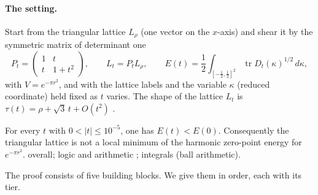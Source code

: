 \paragraph{The setting.} Start from the triangular lattice $L_\rho$ (one vector on the $x$-axis) and shear it by the
symmetric matrix of determinant one
\[
P_t=\begin{pmatrix}1&t\\t&1+t^2\end{pmatrix},\qquad L_t=P_tL_\rho,\qquad
E(t)=\frac12\int_{[-\frac12,\frac12]^2}\operatorname{tr}D_t(\kappa)^{1/2}\,d\kappa ,
\]
with $V=e^{-\pi r^2}$, and with the lattice labels and the variable $\kappa$ (reduced coordinate) held fixed as $t$
varies. The shape of the lattice $L_t$ is $\tau(t)=\rho+\sqrt3\,t+O(t^2)$ \tierC.

\begin{theorem}[B2]\label{ch3:thm:b2}
For every $t$ with $0<|t|\le10^{-5}$, one has $E(t)<E(0)$. Consequently the triangular lattice is not a local minimum
of the harmonic zero-point energy for $e^{-\pi r^2}$. \tierC{} overall; logic and arithmetic \tierAs{}; integrals
\tierC{} (ball arithmetic).
\end{theorem}
\noindent The proof consists of five building blocks. We give them in order, each with its tier.

